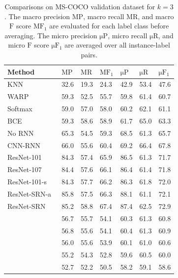 \documentclass[12pt,journal,compsoc]{IEEEtran}
\begin{document}
\begin{table}
\caption{Comparisons on MS-COCO validation dataset for $k=3$. The macro precision $\mathrm{MP}$, macro recall $\mathrm{MR}$, and macro $\mathrm{F}$ score $\mathrm{MF_1}$ are evaluated for each label class before averaging.  The micro precision $\mathrm{\mu P}$, micro recall $\mathrm{\mu R}$, and micro $\mathrm{F}$ score $\mathrm{\mu F_1}$ are averaged over all instance-label pairs.}
\label{tab:PRF1}
\begin{tabular}{lllllll}
\hline
Method & $\mathrm{MP}$ & $\mathrm{MR}$ & $\mathrm{MF_1}$ & $\mathrm{\mu P}$ & $\mathrm{\mu R}$ & $\mathrm{\mu F_1}$ \\
\hline
KNN~\cite{nus-wide-civr09}    & 32.6 & 19.3 & 24.3 & 42.9 & 53.4 & 47.6 \\
WARP~\cite{GongJLTI13}        & 59.3 & 52.5 & 55.7 & 59.8 & 61.4 & 60.7 \\
Softmax~\cite{WangYMHHX16}    & 59.0 & 57.0 & 58.0 & 60.2 & 62.1 & 61.1 \\
BCE~\cite{WangYMHHX16}        & 59.3 & 58.6 & 58.9 & 61.7 & 65.0 & 63.3 \\
No RNN~\cite{WangYMHHX16}     & 65.3 & 54.5 & 59.3 & 68.5 & 61.3 & 65.7 \\
CNN-RNN~\cite{WangYMHHX16}    & 66.0 & 55.6 & 60.4 & 69.2 & 66.4 & 67.8 \\
\hline
ResNet-101~\cite{HeZRS15}     & 84.3 & 57.4 & 65.9 & 86.5 & 61.3 & 71.7 \\
ResNet-107~\cite{ZhuLOYW17}   & 84.4 & 57.6 & 66.1 & 86.4 & 61.4 & 71.8 \\
ResNet-101-s~\cite{ZhuLOYW17} & 84.3 & 57.7 & 66.2 & 86.3 & 61.8 & 72.0 \\
ResNet-SRN-a~\cite{ZhuLOYW17} & 85.8 & 57.5 & 66.3 & 88.1 & 61.1 & 72.1 \\
ResNet-SRN~\cite{ZhuLOYW17}   & 85.2 & 58.8 & 67.4 & 87.4 & 62.5 & 72.9 \\
\hline
             & 56.7 & 55.7 & 54.1 & 60.3 & 61.3 & 60.8 \\ %
             & 56.8 & 55.6 & 54.1 & 60.4 & 61.3 & 60.9 \\ %
             & 56.0 & 55.6 & 53.9 & 60.1 & 61.0 & 60.6 \\ %
             & 55.2 & 54.3 & 52.8 & 59.6 & 60.5 & 60.0 \\ %
             & 52.7 & 52.2 & 50.5 & 58.2 & 59.1 & 58.6 \\ %

\end{tabular}
\end{table}
\end{document}
